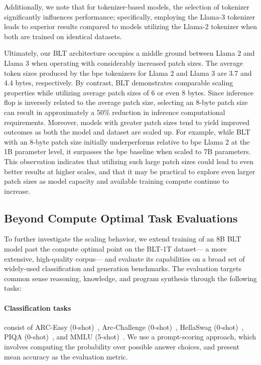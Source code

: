 Additionally, we note that for tokenizer-based models, the selection of tokenizer significantly influences performance; specifically, employing the Llama-3 tokenizer leads to superior results compared to models utilizing the Llama-2 tokenizer when both are trained on identical datasets.

Ultimately, our {\textsc BLT} architecture occupies a middle ground between Llama 2 and Llama 3 when operating with considerably increased patch sizes. The average token sizes produced by the bpe tokenizers for Llama 2 and Llama 3 are 3.7 and 4.4 bytes, respectively. By contrast, {\textsc BLT} demonstrates comparable scaling properties while utilizing average patch sizes of 6 or even 8 bytes. Since inference flop is inversely related to the average patch size, selecting an 8-byte patch size can result in approximately a 50\% reduction in inference computational requirements. Moreover, models with greater patch sizes tend to yield improved outcomes as both the model and dataset are scaled up. For example, while {\textsc BLT} with an 8-byte patch size initially underperforms relative to bpe Llama 2 at the 1B parameter level, it surpasses the bpe baseline when scaled to 7B parameters. This observation indicates that utilizing such large patch sizes could lead to even better results at higher scales, and that it may be practical to explore even larger patch sizes as model capacity and available training compute continue to increase.

\subsection{Beyond Compute Optimal Task Evaluations}
\label{section:evals}
To further investigate the scaling behavior, we extend training of an 8B {\textsc BLT} model past the compute optimal point on the {\textsc BLT}-1T dataset— a more extensive, high-quality corpus— and evaluate its capabilities on a broad set of widely-used classification and generation benchmarks. The evaluation targets common sense reasoning, knowledge, and program synthesis through the following tasks:
\paragraph{Classification tasks} consist of ARC-Easy (0-shot)~\citep{Eval_ARC}, Arc-Challenge (0-shot)~\citep{Eval_ARC}, HellaSwag (0-shot)~\citep{Eval_hellaswag}, PIQA (0-shot)~\citep{Eval_piqa}, and MMLU (5-shot)~\citep{hendrycks2020measuring}. We use a prompt-scoring approach, which involves computing the probability over possible answer choices, and present mean accuracy as the evaluation metric.
